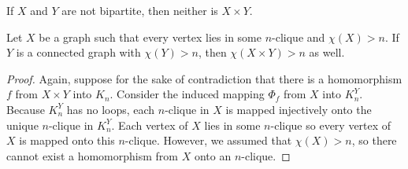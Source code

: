 \begin{corollary}
	If $X$ and $Y$ are not bipartite, then neither is $X\times Y$.
\end{corollary}

\begin{corollary}
	Let $X$ be a graph such that every vertex lies in some $n$-clique and $\chi(X)>n$.  If $Y$ is a connected graph with $\chi(Y)>n$, then $\chi(X\times Y)>n$ as well.
\end{corollary}

\begin{proof}
	Again, suppose for the sake of contradiction that there is a homomorphism $f$ from $X\times Y$ into $K_n$.  Consider the induced mapping $\Phi_f$ from $X$ into $K_n^Y$.  Because $K_n^Y$ has no loops, each $n$-clique in $X$ is mapped injectively onto the unique $n$-clique in $K_n^Y$.  Each vertex of $X$ lies in some $n$-clique so every vertex of $X$ is mapped onto this $n$-clique.  However, we assumed that $\chi(X)>n$, so there cannot exist a homomorphism from $X$ onto an $n$-clique.
\end{proof}